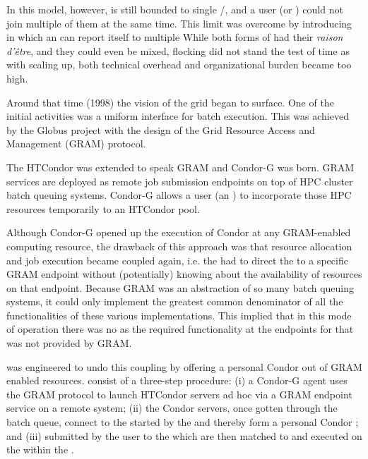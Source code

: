 \documentclass{sig-alternate}
\begin{document}

In this model, however,  is still bounded to single
/, and a user (or )
could not join multiple of them at the same time.
%
%
This limit was overcome by introducing  in which an
 can report itself to multiple 
While both forms of  had their \textit{raison d'\^{e}tre},
and they could even be mixed,  flocking did not stand the test
of time as with scaling up, both technical overhead and organizational burden
became too high.

%
%
Around that time (1998) the vision of the grid began to surface. One of the
initial activities was a uniform interface for batch execution. This was
achieved by the Globus project with the design of the Grid Resource Access and
Management (GRAM) protocol.

The HTCondor  was extended to speak GRAM and Condor-G
\cite{condor-g} was born. GRAM services are deployed as remote job submission
endpoints on top of HPC cluster batch queuing systems. Condor-G allows a user
(an ) to incorporate those HPC resources temporarily to an
HTCondor pool.

Although Condor-G opened up the execution of Condor  at any
GRAM-enabled computing resource, the drawback of this approach was that
resource allocation and job execution became coupled again, i.e. the
 had to direct the  to a specific GRAM endpoint
without (potentially) knowing about the availability of resources on that
endpoint. Because GRAM was an abstraction of so many batch queuing systems, it
could only implement the greatest common denominator of all the functionalities
of these various implementations. This implied that in this mode of operation
there was no  as the required functionality at the
endpoints for that was not provided by GRAM.

%
%
 was engineered to undo this coupling by offering a
personal Condor  out of GRAM enabled resources.  consist of a three-step procedure: (i) a Condor-G agent uses the GRAM
protocol to launch HTCondor servers ad hoc via a GRAM endpoint service on a
remote system; (ii) the Condor servers, once gotten through the batch queue,
connect to the  started by the  and thereby
form a personal Condor ; and (iii)  submitted by
the user to the  which are then matched to and executed on the
 within the .
\end{document}
